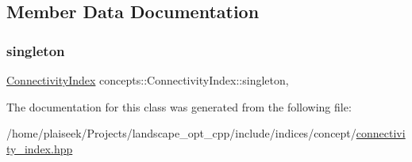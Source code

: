 \subsection{Member Data Documentation}
\mbox{\label{classconcepts_1_1_connectivity_index_a6c3d718aa3d0a00d648560ea0ef89eb4}} 
\subsubsection{\texorpdfstring{singleton}{singleton}}
{\footnotesize\ttfamily \hyperlink{classconcepts_1_1_connectivity_index}{Connectivity\+Index} concepts\+::\+Connectivity\+Index\+::singleton\hspace{0.3cm}{\ttfamily [static]}, {\ttfamily [protected]}}



The documentation for this class was generated from the following file\+:\begin{DoxyCompactItemize}
\item 
/home/plaiseek/\+Projects/landscape\+\_\+opt\+\_\+cpp/include/indices/concept/\hyperlink{connectivity__index_8hpp}{connectivity\+\_\+index.\+hpp}\end{DoxyCompactItemize}
